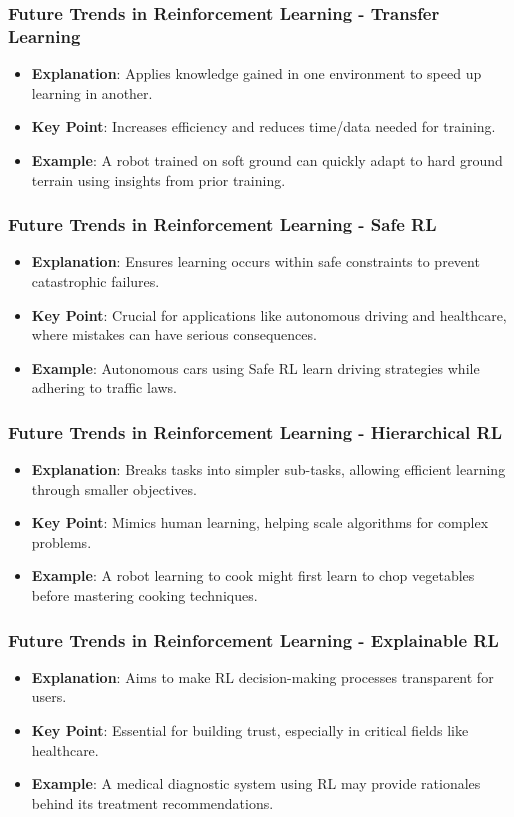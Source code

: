 \documentclass[aspectratio=169]{beamer}
\begin{document}
\begin{frame}[fragile]
    \frametitle{Future Trends in Reinforcement Learning - Transfer Learning}
    \begin{itemize}
        \item \textbf{Explanation}: Applies knowledge gained in one environment to speed up learning in another.
        \item \textbf{Key Point}: Increases efficiency and reduces time/data needed for training.
        \item \textbf{Example}: A robot trained on soft ground can quickly adapt to hard ground terrain using insights from prior training.
    \end{itemize}
\end{frame}

\begin{frame}[fragile]
    \frametitle{Future Trends in Reinforcement Learning - Safe RL}
    \begin{itemize}
        \item \textbf{Explanation}: Ensures learning occurs within safe constraints to prevent catastrophic failures.
        \item \textbf{Key Point}: Crucial for applications like autonomous driving and healthcare, where mistakes can have serious consequences.
        \item \textbf{Example}: Autonomous cars using Safe RL learn driving strategies while adhering to traffic laws.
    \end{itemize}
\end{frame}

\begin{frame}[fragile]
    \frametitle{Future Trends in Reinforcement Learning - Hierarchical RL}
    \begin{itemize}
        \item \textbf{Explanation}: Breaks tasks into simpler sub-tasks, allowing efficient learning through smaller objectives.
        \item \textbf{Key Point}: Mimics human learning, helping scale algorithms for complex problems.
        \item \textbf{Example}: A robot learning to cook might first learn to chop vegetables before mastering cooking techniques.
    \end{itemize}
\end{frame}

\begin{frame}[fragile]
    \frametitle{Future Trends in Reinforcement Learning - Explainable RL}
    \begin{itemize}
        \item \textbf{Explanation}: Aims to make RL decision-making processes transparent for users.
        \item \textbf{Key Point}: Essential for building trust, especially in critical fields like healthcare.
        \item \textbf{Example}: A medical diagnostic system using RL may provide rationales behind its treatment recommendations.
    \end{itemize}
\end{frame}
\end{document}
